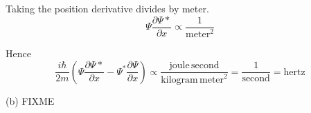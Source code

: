 Taking the position derivative divides by meter.
\begin{equation*}
\Psi\frac{\partial\Psi*}{\partial x}\propto\frac{1}{\text{meter}^2}
\end{equation*}

Hence
\begin{equation*}
\frac{i\hbar}{2m}\left(\Psi\frac{\partial\Psi*}{\partial x}-\Psi^*\frac{\partial\Psi}{\partial x}\right)
\propto\frac{\text{joule}\,\text{second}}{\text{kilogram}\,\text{meter}^2}
=\frac{1}{\text{second}}=\text{hertz}
\end{equation*}

\bigskip
(b) FIXME


